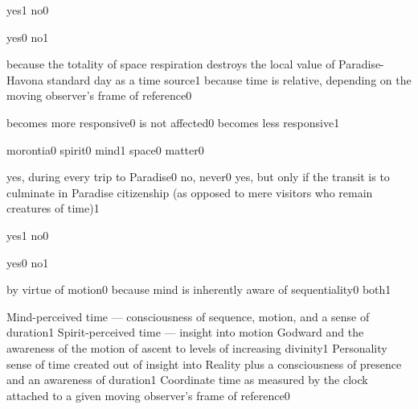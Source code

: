 {yes}{1}
{no}{0}
\qstop

{yes}{0}
{no}{1}
\qstop


{because the totality of space respiration destroys the local value of Paradise-Havona standard day as a time source}{1}
{because time is relative, depending on the moving observer's frame of reference}{0}
\qstop

{becomes more responsive}{0}
{is not affected}{0}
{becomes less responsive}{1}
\qstop

{morontia}{0}
{spirit}{0}
{mind}{1}
{space}{0}
{matter}{0}
\qstop

{yes, during every trip to Paradise}{0}
{no, never}{0}
{yes, but only if the transit is to culminate in Paradise citizenship (as opposed to mere visitors who remain creatures of time)}{1}
\qstop

{yes}{1}
{no}{0}
\qstop

{yes}{0}
{no}{1}
\qstop

{by virtue of motion}{0}
{because mind is inherently aware of sequentiality}{0}
{both}{1}
\qstop

{Mind-perceived time --- consciousness of sequence, motion, and a sense of duration}{1}
{Spirit-perceived time --- insight into motion Godward and the awareness of the motion of ascent to levels of increasing divinity}{1}
{Personality sense of time created out of insight into Reality plus a consciousness of presence and an awareness of duration}{1}
{Coordinate time as measured by the clock attached to a given moving observer's frame of reference}{0}
\qstop

